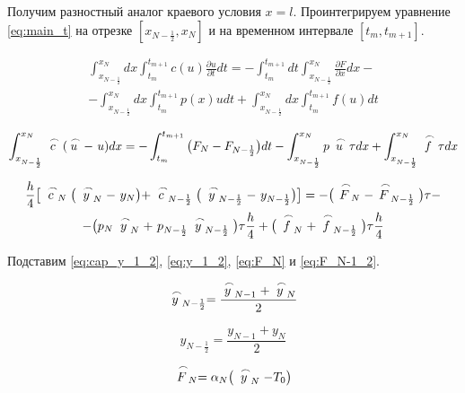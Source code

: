 Получим разностный аналог краевого условия $x=l$. Проинтегрируем уравнение \ref{eq:main_t} на отрезке $[x_{N-\frac{1}{2}}, x_N]$ и на временном интервале $[t_m, t_{m+1}]$.

\begin{multline*}
    \int_{x_{N-\frac{1}{2}}}^{x_N} dx \int_{t_m}^{t_{m+1}} c(u) \frac{\partial u}{\partial t} dt = - \int_{t_m}^{t_{m+1}} dt \int_{x_{N-\frac{1}{2}}}^{x_N} \frac{\partial F}{\partial x} dx - \\
    - \int_{x_{N-\frac{1}{2}}}^{x_N} dx \int_{t_m}^{t_{m+1}} p(x) u dt + \int_{x_{N-\frac{1}{2}}}^{x_N} dx \int_{t_m}^{t_{m+1}} f(u) dt
\end{multline*}

\begin{equation*}
    \int_{x_{N-\frac{1}{2}}}^{x_N} \LittleCap{c} (\LittleCap{u} -\ u) dx = - \int_{t_m}^{t_{m+1}} \big( F_N - F_{N - \frac{1}{2}} \big) dt - \int_{x_{N-\frac{1}{2}}}^{x_N} p \LittleCap{u} \tau dx + \int_{x_{N - \frac{1}{2}}}^{x_N} \LittleCap{f} \tau dx
\end{equation*}

\begin{multline*}
    \frac{h}{4} \big[ \LittleCap{c}_N \big( \LittleCap{y}_N -\ y_N \big) + \LittleCap{c}_{N-\frac{1}{2}} \big( \LittleCap{y}_{N-\frac{1}{2}} -\ y_{N-\frac{1}{2}} \big) \big] = - \big( \LittleCap{F}_N - \LittleCap{F}_{N-\frac{1}{2}} \big) \tau - \\
    - \big( p_N \LittleCap{y}_N +\ p_{N-\frac{1}{2}} \LittleCap{y}_{N-\frac{1}{2}} \big) \tau \frac{h}{4} + \big( \LittleCap{f}_N + \LittleCap{f}_{N-\frac{1}{2}} \big) \tau \frac{h}{4}
\end{multline*}

Подставим \ref{eq:cap_y_1_2}, \ref{eq:y_1_2}, \ref{eq:F_N} и \ref{eq:F_N-1_2}.

\begin{equation}\label{eq:cap_y_1_2}
    \LittleCap{y}_{N-\frac{1}{2}} = \frac{\LittleCap{y}_{N-1} + \LittleCap{y}_N}{2}
\end{equation}

\begin{equation}\label{eq:y_1_2}
    y_{N-\frac{1}{2}} = \frac{y_{N-1} + y_N}{2}
\end{equation}

\begin{equation}\label{eq:F_N}
    \LittleCap{F}_N = \alpha_N \big( \LittleCap{y}_N - T_0 \big)
\end{equation}

